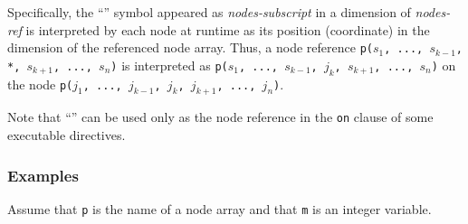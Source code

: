 Specifically, the ``{\tt *}'' symbol appeared as {\it nodes-subscript}
in a dimension of {\it nodes-ref} is interpreted by each node at runtime
as its position (coordinate) in the dimension of the referenced node
array.
%
Thus, a node reference {\tt p($s_1$, ..., $s_{k-1}$, *, $s_{k+1}$, ..., $s_n$)} 
is interpreted as {\tt p($s_1$, ..., $s_{k-1}$, $j_k$, $s_{k+1}$, ..., $s_n$)} 
on the node {\tt p($j_1$, ..., $j_{k-1}$, $j_k$, $j_{k+1}$, ..., $j_n$)}.

%

Note that ``{\tt *}'' can be used only as the node reference in
the {\tt on} clause of some executable directives.


\subsubsection*{Examples}

Assume that {\tt p} is the name of a node array and that {\tt m} is an
integer variable.

